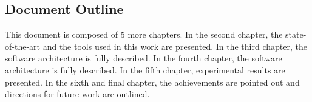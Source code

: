 
\subsection{Document Outline}

This document is composed of 5 more chapters. In the second chapter, the state-of-the-art and the tools used in this work are presented. In the third chapter, the software architecture is fully described. In the fourth chapter, the software architecture is fully described. In the fifth chapter, experimental results are presented. In the sixth and final chapter, the achievements are pointed out and directions for future work are outlined.
